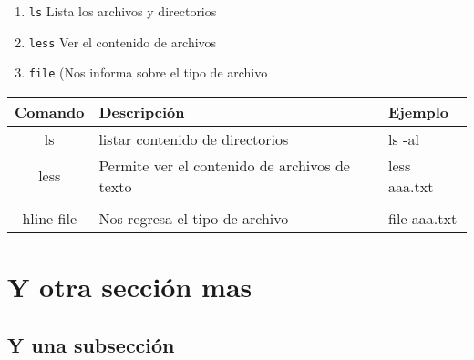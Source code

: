 \documentclass[12pt]{article}
\begin{document}
\begin{enumerate}
\item {\tt ls} Lista los archivos y directorios
\item {\tt less} Ver el contenido de archivos
\item {\tt file} (Nos informa sobre el tipo de archivo
\end{enumerate}

\begin{tabular}{|c|l|l|}
\hline
Comando & Descripción & Ejemplo \\
\hline
ls & listar contenido de directorios & ls -al \\ \hline
less & Permite ver el contenido de archivos de texto & less aaa.txt \\ \\hline
file & Nos regresa el tipo de archivo & file aaa.txt \\
\hline
\end{tabular} 

\section{Y otra sección mas}
\subsection{Y una subsección}


\end{document}
